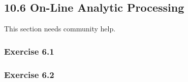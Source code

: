 \documentclass[../../main.tex]{subfiles}
\begin{document}
\subsection{10.6 On-Line Analytic Processing}

This section needs community help.

\subsubsection*{Exercise 6.1}

\subsubsection*{Exercise 6.2}
\end{document}
